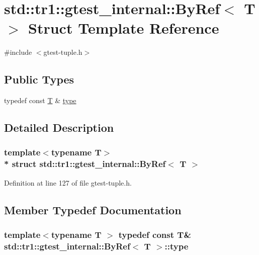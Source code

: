 \hypertarget{structstd_1_1tr1_1_1gtest__internal_1_1_by_ref}{}\section{std\+:\+:tr1\+:\+:gtest\+\_\+internal\+:\+:By\+Ref$<$ T $>$ Struct Template Reference}
\label{structstd_1_1tr1_1_1gtest__internal_1_1_by_ref}


{\ttfamily \#include $<$gtest-\/tuple.\+h$>$}

\subsection*{Public Types}
\begin{DoxyCompactItemize}
\item 
typedef const \hyperlink{functions__7_8js_adf1f3edb9115acb0a1e04209b7a9937b}{T} \& \hyperlink{structstd_1_1tr1_1_1gtest__internal_1_1_by_ref_ac42ad942ee1cfa86b2abcce9b88ac10e}{type}
\end{DoxyCompactItemize}


\subsection{Detailed Description}
\subsubsection*{template$<$typename T$>$\\*
struct std\+::tr1\+::gtest\+\_\+internal\+::\+By\+Ref$<$ T $>$}



Definition at line 127 of file gtest-\/tuple.\+h.



\subsection{Member Typedef Documentation}
\subsubsection[{\texorpdfstring{type}{type}}]{\setlength{\rightskip}{0pt plus 5cm}template$<$typename T $>$ typedef const {\bf T}\& {\bf std\+::tr1\+::gtest\+\_\+internal\+::\+By\+Ref}$<$ {\bf T} $>$\+::{\bf type}}\hypertarget{structstd_1_1tr1_1_1gtest__internal_1_1_by_ref_ac42ad942ee1cfa86b2abcce9b88ac10e}{}\label{structstd_1_1tr1_1_1gtest__internal_1_1_by_ref_ac42ad942ee1cfa86b2abcce9b88ac10e}



